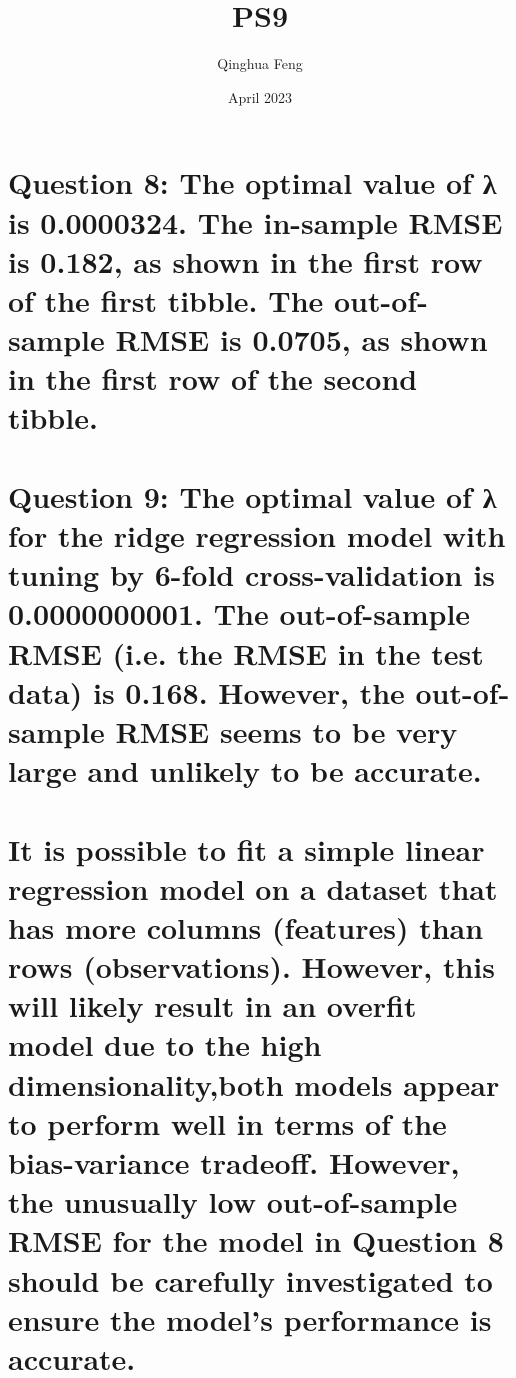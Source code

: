 \documentclass{article}
\title{PS9}
\author{Qinghua Feng }
\date{April 2023}
\begin{document}
\maketitle

\section{Question 8: The optimal value of λ is 0.0000324.
The in-sample RMSE is 0.182, as shown in the first row of the first tibble.
The out-of-sample RMSE is 0.0705, as shown in the first row of the second tibble.}

\section{Question 9: The optimal value of λ for the ridge regression model with tuning by 6-fold cross-validation is 0.0000000001. The out-of-sample RMSE (i.e. the RMSE in the test data) is 0.168. However, the out-of-sample RMSE seems to be very large and unlikely to be accurate. }

\section{It is possible to fit a simple linear regression model on a dataset that has more columns (features) than rows (observations). However, this will likely result in an overfit model due to the high dimensionality,both models appear to perform well in terms of the bias-variance tradeoff. However, the unusually low out-of-sample RMSE for the model in Question 8 should be carefully investigated to ensure the model's performance is accurate.}
\end{document}
